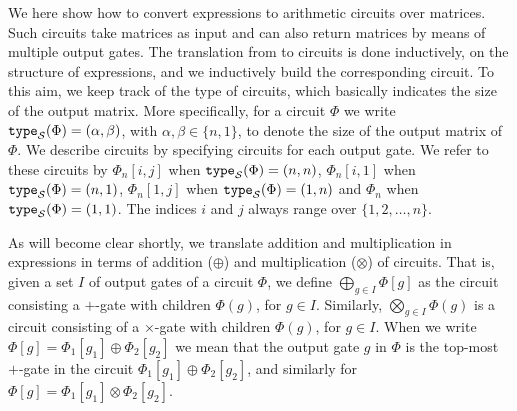 We here show how to convert \langfor expressions to arithmetic circuits over matrices.
Such circuits take matrices as input and can also return matrices by means of multiple
output gates. The translation from \langfor to circuits is done inductively, on the structure
of \langfor expressions, and we inductively build the corresponding circuit. To this aim, we keep track of
the type of circuits, which basically indicates the size of the output matrix. More specifically,
for a circuit $\Phi$ we write $\texttt{type}_{\mathcal{S}}(\Phi)=(\alpha,\beta)$, with $\alpha,\beta\in \{n,1\}$, to denote the size of 
the output matrix of $\Phi$. 
%
%
We describe circuits by specifying circuits for each output gate. We refer to
these circuits by $\Phi_{n}[i,j]$ when $\texttt{type}_{\mathcal{S}}(\Phi)=(n,n)$, 
$\Phi_{n}[i,1]$ when $\texttt{type}_{\mathcal{S}}(\Phi)=(n,1)$, $\Phi_{n}[1,j]$ when $\texttt{type}_{\mathcal{S}}(\Phi)=(1,n)$ and 
$\Phi_{n}$ when $\texttt{type}_{\mathcal{S}}(\Phi)=(1,1)$. The indices $i$ and $j$ always range over $\{1,2,\ldots,n\}$.


As will become clear shortly, we translate addition and multiplication in \langfor
expressions in terms of addition ($\oplus$) and multiplication ($\otimes$) of circuits.
That is, given a set $I$ of output gates of a circuit $\Phi$, we define 
$\bigoplus_{g\in I} \Phi[g]$ as the circuit consisting a $+$-gate with children
$\Phi(g)$, for $g\in I$. Similarly, $\bigotimes_{g\in I} \Phi(g)$ is a circuit
consisting of a $\times$-gate with children $\Phi(g)$, for $g\in I$. When 
we write $\Phi[g]=\Phi_1[g_1]\oplus \Phi_2[g_2]$ we mean that the output gate
$g$ in $\Phi$ is the top-most $+$-gate in the circuit $\Phi_1[g_1]\oplus \Phi_2[g_2]$, and 
similarly for $\Phi[g]=\Phi_1[g_1]\otimes \Phi_2[g_2]$.


